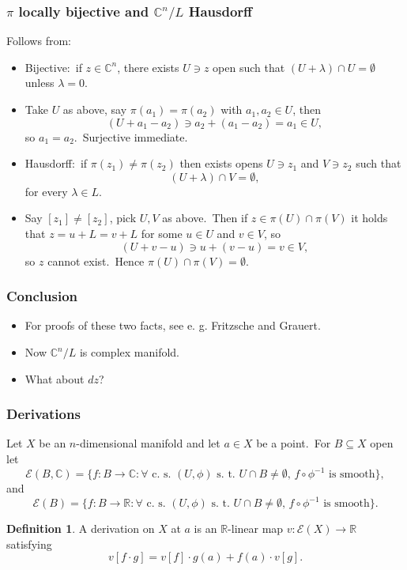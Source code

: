 \documentclass[usenames,dvipsnames]{beamer}
\theoremstyle{definition}
\newtheorem{defi}{Definition}
\begin{document}
\begin{frame}
  \frametitle{$\pi$ locally bijective and $\mathbb{C}^n/L$ Hausdorff}
  Follows from:
  \begin{itemize}
    \item Bijective:\pause~if $z\in\mathbb{C}^n$, there exists $U\ni z$ open such that $(U+\lambda)\cap U=\emptyset$ unless $\lambda=0$.\pause
    \item Take $U$ as above, say $\pi(a_1)=\pi(a_2)$ with $a_1,a_2\in U$, then\pause
      \[(U+a_1-a_2)\ni a_2+(a_1-a_2)=a_1\in U,\]\pause
      so $a_1=a_2$.\pause~Surjective immediate.\pause
    \item Hausdorff:\pause~if $\pi(z_1)\neq\pi(z_2)$ then exists opens $U\ni z_1$ and $V\ni z_2$ such that
      \[(U+\lambda)\cap V=\emptyset,\]\pause
      for every $\lambda\in L$.\pause
    \item Say $[z_1]\neq [z_2]$, pick $U,V$ as above.\pause~Then if $z\in\pi(U)\cap\pi(V)$ it holds that $z=u+L=v+L$ for some $u\in U$ and $v\in V$, so\pause
      \[(U+v-u)\ni u+(v-u)=v\in V,\]\pause
      so $z$ cannot exist.\pause~Hence $\pi(U)\cap\pi(V)=\emptyset$.
  \end{itemize}
\end{frame}

\begin{frame}
  \frametitle{Conclusion}
  \begin{itemize}
    \item For proofs of these two facts, see e. g. Fritzsche and Grauert.\pause
    \item Now $\mathbb{C}^n/L$ is complex manifold.\pause
    \item What about $dz$?
  \end{itemize}
\end{frame}

\begin{frame}
  \frametitle{Derivations}
  Let $X$ be an $n$-dimensional manifold and let $a\in X$ be a point.\pause~For $B\subseteq X$ open let\pause
  \[\mathcal{E}(B,\mathbb{C})=\{f:B\to\mathbb{C}:\forall\text{ c. s. }(U,\phi)\text{ s. t. }U\cap B\neq\emptyset\text{, }f\circ\phi^{-1}\text{ is smooth}\},\]\pause
  and\pause 
  \[\mathcal{E}(B)=\{f:B\to\mathbb{R}:\forall\text{ c. s. }(U,\phi)\text{ s. t. }U\cap B\neq\emptyset\text{, }f\circ\phi^{-1}\text{ is smooth}\}.\]\pause
  \begin{defi}
    A derivation on $X$ at $a$ is an $\mathbb{R}$-linear map $v:\mathcal{E}(X)\to\mathbb{R}$ satisfying\pause
    \[v[f\cdot g]=v[f]\cdot g(a)+f(a)\cdot v[g].\]
  \end{defi}
\end{frame}
\end{document}
